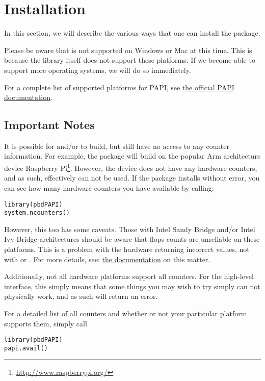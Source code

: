 \section{Installation}
\label{sec:installation}

In this section, we will describe the various ways that one can install the 
\thispackage package.

Please be aware that \thispackage is not supported on Windows or Mac at this 
time.  This is because the \PAPI library itself does not support these 
platforms.  If we become able to support more operating systems, we will do so 
immediately.

For a complete list of supported platforms for PAPI, see 
\href{http://icl.cs.utk.edu/papi/custom/index.html?lid=62&slid=96}%
{the official PAPI documentation}.



\subsection{Important Notes}

It is possible for \PAPI and/or \thispackage to build, but still have no access
to any counter information.  For example, the package will build on the popular 
Arm architecture device 
Raspberry Pi\footnote{\url{http://www.raspberrypi.org/}}.
However, the device does not have any hardware counters, and as such, 
\thispackage effectively can not be used.  If the package installs without 
error, you can see how many hardware counters you have available by calling:
\begin{lstlisting}[language=rr]
library(pbdPAPI)
system.ncounters()
\end{lstlisting}

However, this too has some caveats.  Those with Intel Sandy Bridge and/or Intel 
Ivy Bridge architectures should be aware that flops counts are unreliable on 
these platforms.  This is a problem with the hardware returning incorrect 
values, not with \PAPI or \thispackage.  For more details, see: 
\href{http://icl.cs.utk.edu/projects/papi/wiki/PAPITopics:SandyFlops}%
{the \PAPI documentation} on this matter.


Additionally, not all hardware platforms support all counters.  For the 
high-level 
interface, this simply means that some things you may wish to try simply can 
not physically work, and as such will return an error.  

For a detailed list of all counters and whether or not your particular platform 
supports them, simply call 
\begin{lstlisting}[language=rr]
library(pbdPAPI)
papi.avail()
\end{lstlisting}





